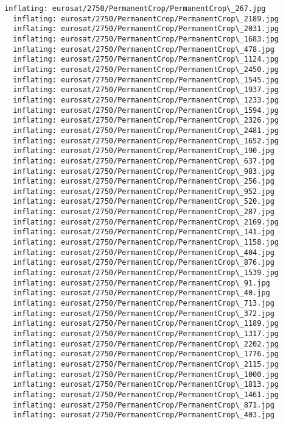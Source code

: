 \documentclass[11pt]{article}
\begin{document}
\begin{Verbatim}[commandchars=\\\{\}]
  inflating: eurosat/2750/PermanentCrop/PermanentCrop\_267.jpg
  inflating: eurosat/2750/PermanentCrop/PermanentCrop\_2189.jpg
  inflating: eurosat/2750/PermanentCrop/PermanentCrop\_2031.jpg
  inflating: eurosat/2750/PermanentCrop/PermanentCrop\_1683.jpg
  inflating: eurosat/2750/PermanentCrop/PermanentCrop\_478.jpg
  inflating: eurosat/2750/PermanentCrop/PermanentCrop\_1124.jpg
  inflating: eurosat/2750/PermanentCrop/PermanentCrop\_2450.jpg
  inflating: eurosat/2750/PermanentCrop/PermanentCrop\_1545.jpg
  inflating: eurosat/2750/PermanentCrop/PermanentCrop\_1937.jpg
  inflating: eurosat/2750/PermanentCrop/PermanentCrop\_1233.jpg
  inflating: eurosat/2750/PermanentCrop/PermanentCrop\_1594.jpg
  inflating: eurosat/2750/PermanentCrop/PermanentCrop\_2326.jpg
  inflating: eurosat/2750/PermanentCrop/PermanentCrop\_2481.jpg
  inflating: eurosat/2750/PermanentCrop/PermanentCrop\_1652.jpg
  inflating: eurosat/2750/PermanentCrop/PermanentCrop\_190.jpg
  inflating: eurosat/2750/PermanentCrop/PermanentCrop\_637.jpg
  inflating: eurosat/2750/PermanentCrop/PermanentCrop\_983.jpg
  inflating: eurosat/2750/PermanentCrop/PermanentCrop\_256.jpg
  inflating: eurosat/2750/PermanentCrop/PermanentCrop\_952.jpg
  inflating: eurosat/2750/PermanentCrop/PermanentCrop\_520.jpg
  inflating: eurosat/2750/PermanentCrop/PermanentCrop\_287.jpg
  inflating: eurosat/2750/PermanentCrop/PermanentCrop\_2169.jpg
  inflating: eurosat/2750/PermanentCrop/PermanentCrop\_141.jpg
  inflating: eurosat/2750/PermanentCrop/PermanentCrop\_1158.jpg
  inflating: eurosat/2750/PermanentCrop/PermanentCrop\_404.jpg
  inflating: eurosat/2750/PermanentCrop/PermanentCrop\_876.jpg
  inflating: eurosat/2750/PermanentCrop/PermanentCrop\_1539.jpg
  inflating: eurosat/2750/PermanentCrop/PermanentCrop\_91.jpg
  inflating: eurosat/2750/PermanentCrop/PermanentCrop\_40.jpg
  inflating: eurosat/2750/PermanentCrop/PermanentCrop\_713.jpg
  inflating: eurosat/2750/PermanentCrop/PermanentCrop\_372.jpg
  inflating: eurosat/2750/PermanentCrop/PermanentCrop\_1189.jpg
  inflating: eurosat/2750/PermanentCrop/PermanentCrop\_1317.jpg
  inflating: eurosat/2750/PermanentCrop/PermanentCrop\_2202.jpg
  inflating: eurosat/2750/PermanentCrop/PermanentCrop\_1776.jpg
  inflating: eurosat/2750/PermanentCrop/PermanentCrop\_2115.jpg
  inflating: eurosat/2750/PermanentCrop/PermanentCrop\_1000.jpg
  inflating: eurosat/2750/PermanentCrop/PermanentCrop\_1813.jpg
  inflating: eurosat/2750/PermanentCrop/PermanentCrop\_1461.jpg
  inflating: eurosat/2750/PermanentCrop/PermanentCrop\_871.jpg
  inflating: eurosat/2750/PermanentCrop/PermanentCrop\_403.jpg

\end{Verbatim}
\end{document}
